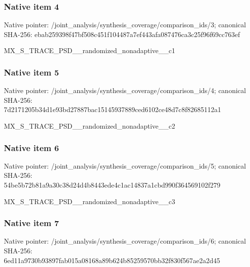 \documentclass[10pt,a4paper]{article}
\begin{document}
\subsubsection{Native item 4}
Native pointer: /joint\_\allowbreak{}analysis/synthesis\_\allowbreak{}coverage/comparison\_\allowbreak{}ids/3; canonical SHA-256: ebab259398f47bf508c451f104487a7ef443afa087476ca3c25f96f69cc763ef

\begingroup\raggedright\sloppy MX\_\allowbreak{}S\_\allowbreak{}TRACE\_\allowbreak{}PSD\_\allowbreak{}\_\allowbreak{}randomized\_\allowbreak{}nonadaptive\_\allowbreak{}\_\allowbreak{}c1\par\endgroup

\subsubsection{Native item 5}
Native pointer: /joint\_\allowbreak{}analysis/synthesis\_\allowbreak{}coverage/comparison\_\allowbreak{}ids/4; canonical SHA-256: 7d2171205b34d1e93bd27887bac15145937889ced6102ce48d7c8f82685112a1

\begingroup\raggedright\sloppy MX\_\allowbreak{}S\_\allowbreak{}TRACE\_\allowbreak{}PSD\_\allowbreak{}\_\allowbreak{}randomized\_\allowbreak{}nonadaptive\_\allowbreak{}\_\allowbreak{}c2\par\endgroup

\subsubsection{Native item 6}
Native pointer: /joint\_\allowbreak{}analysis/synthesis\_\allowbreak{}coverage/comparison\_\allowbreak{}ids/5; canonical SHA-256: 54be5b72b81a9a30c38d24d4b8443ede4c1ac14837a1cbd990f364569102f279

\begingroup\raggedright\sloppy MX\_\allowbreak{}S\_\allowbreak{}TRACE\_\allowbreak{}PSD\_\allowbreak{}\_\allowbreak{}randomized\_\allowbreak{}nonadaptive\_\allowbreak{}\_\allowbreak{}c3\par\endgroup

\subsubsection{Native item 7}
Native pointer: /joint\_\allowbreak{}analysis/synthesis\_\allowbreak{}coverage/comparison\_\allowbreak{}ids/6; canonical SHA-256: 6ed11a9730b93897fab015a08168a89b624b85259570bb32f830f567ae2a2d45
\end{document}
